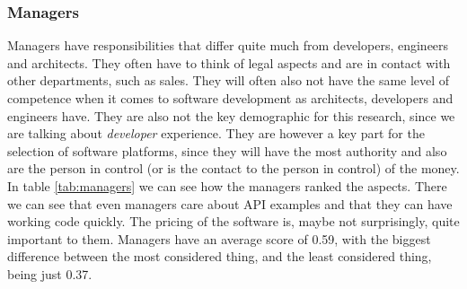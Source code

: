\documentclass{article}
\begin{document}
\subsubsection{Managers}
Managers have responsibilities that differ quite much from developers, engineers and architects. They often have to think of legal aspects and are in contact with other departments, such as sales. They will often also not have the same level of competence when it comes to software development as architects, developers and engineers have. They are also not the key demographic for this research, since we are talking about \textit{developer} experience. They are however a key part for the selection of software platforms, since they will have the most authority and also are the person in control (or is the contact to the person in control) of the money. In table \ref{tab:managers} we can see how the managers ranked the aspects. There we can see that even managers care about API examples and that they can have working code quickly. The pricing of the software is, maybe not surprisingly, quite important to them. Managers have an average score of 0.59, with the biggest difference between the most considered thing, and the least considered thing, being just 0.37.
\end{document}
